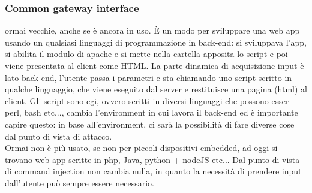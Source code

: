 \documentclass{article}
\begin{document}
\subsubsection{Common gateway interface}ormai vecchie, anche se è ancora in uso. È un modo per sviluppare una web app usando un qualsiasi linguaggi di programmazione in back-end: si sviluppava l'app, si abilita il modulo di apache e si mette nella cartella apposita lo script e poi viene presentata al client come HTML. La parte dinamica di acquisizione input è lato back-end, l'utente passa i parametri e sta chiamando uno script scritto in qualche linguaggio, che viene eseguito dal server e restituisce una pagina (html) al client. Gli script sono cgi, ovvero scritti in diversi linguaggi che possono esser perl, bash etc..., cambia l'environment in cui lavora il back-end ed è importante capire questo: in base all'environment, ci sarà la possibilità di fare diverse cose dal punto di vista di attacco.\\ Ormai non è più usato, se non per piccoli dispositivi embedded, ad oggi si trovano web-app scritte in php, Java, python + nodeJS etc... Dal punto di vista di command injection non cambia nulla, in quanto la necessità di prendere input dall'utente può sempre essere necessario.
\end{document}
